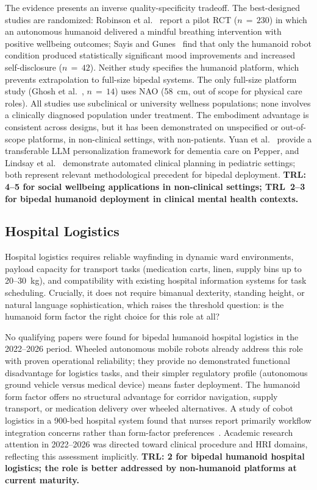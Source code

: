\documentclass[acmsmall]{acmart}
\begin{document}
The evidence presents an inverse quality-specificity tradeoff. The
best-designed studies are randomized: Robinson et al.~\cite{robinson2023brief}
report a pilot RCT ($n\,=\,230$) in which an autonomous humanoid delivered a
mindful breathing intervention with positive wellbeing outcomes; Sayis and
Gunes~\cite{sayis2024technology} find that only the humanoid robot condition
produced statistically significant mood improvements and increased self-disclosure
($n\,=\,42$). Neither study specifies the humanoid platform, which prevents
extrapolation to full-size bipedal systems. The only full-size platform study
(Ghosh et al.~\cite{ghosh2024usercentered}, $n\,=\,14$) uses NAO (58~cm, out of
scope for physical care roles). All studies use subclinical or university wellness
populations; none involves a clinically diagnosed population under treatment. The
embodiment advantage is consistent across designs, but it has been demonstrated
on unspecified or out-of-scope platforms, in non-clinical settings, with
non-patients. Yuan et al.~\cite{yuan2025integrating} provide a transferable LLM
personalization framework for dementia care on Pepper, and Lindsay et
al.~\cite{lindsay2022socially} demonstrate automated clinical planning in
pediatric settings; both represent relevant methodological precedent for bipedal
deployment. \textbf{TRL: 4--5 for social wellbeing applications in non-clinical
settings; TRL~2--3 for bipedal humanoid deployment in clinical mental health
contexts.}

\subsection{Hospital Logistics}
\label{sec:logistics}

Hospital logistics requires reliable wayfinding in dynamic ward environments,
payload capacity for transport tasks (medication carts, linen, supply bins up to
20--30~kg), and compatibility with existing hospital information systems for task
scheduling. Crucially, it does not require bimanual dexterity, standing height,
or natural language sophistication, which raises the threshold question: is the
humanoid form factor the right choice for this role at all?

No qualifying papers were found for bipedal humanoid hospital logistics in the
2022--2026 period. Wheeled autonomous mobile robots already address this role
with proven operational reliability; they provide no demonstrated functional
disadvantage for logistics tasks, and their simpler regulatory profile
(autonomous ground vehicle versus medical device) means faster deployment.
The humanoid form factor offers no structural advantage for corridor navigation,
supply transport, or medication delivery over wheeled alternatives. A study of cobot logistics in a 900-bed hospital system found that nurses
report primarily workflow integration concerns rather than form-factor
preferences~\cite{birkhoff2024integrating}. Academic research attention in
2022--2026 was directed toward clinical procedure and HRI domains, reflecting this assessment implicitly. \textbf{TRL: 2 for bipedal
humanoid hospital logistics; the role is better addressed by non-humanoid
platforms at current maturity.}
\end{document}
